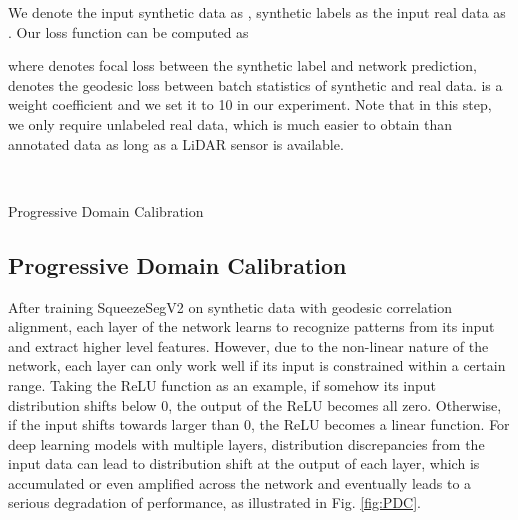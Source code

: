 \documentclass[letterpaper, 10 pt, conference]{ieeeconf}
\begin{document}
We denote the input synthetic data as , synthetic labels as  the input real data as . Our loss function can be computed as

where  denotes focal loss between the synthetic label and network prediction,  denotes the geodesic loss between batch statistics of synthetic and real data.  is a weight coefficient and we set it to 10 in our experiment. Note that in this step, we only require unlabeled real data, which is much easier to obtain than annotated data as long as a LiDAR sensor is available.



\begin{algorithm}[!t]
{
\small
{}
 \\

}
\small\caption{Progressive Domain Calibration}
\label{Alg:MTSSRLearning}
\end{algorithm}


\subsection{Progressive Domain Calibration}
\label{ssec:PBA}
After training SqueezeSegV2 on synthetic data with geodesic correlation alignment, each layer of the network learns to recognize patterns from its input and extract higher level features. However, due to the non-linear nature of the network, each layer can only work well if its input is constrained within a certain range. Taking the ReLU function as an example, if somehow its input distribution shifts below 0, the output of the ReLU becomes all zero. Otherwise, if the input shifts towards larger than 0, the ReLU becomes a linear function. For deep learning models with multiple layers, distribution discrepancies from the input data can lead to distribution shift at the output of each layer, which is accumulated or even amplified across the network and eventually leads to a serious degradation of performance, as illustrated in Fig. \ref{fig:PDC}.  
\end{document}
